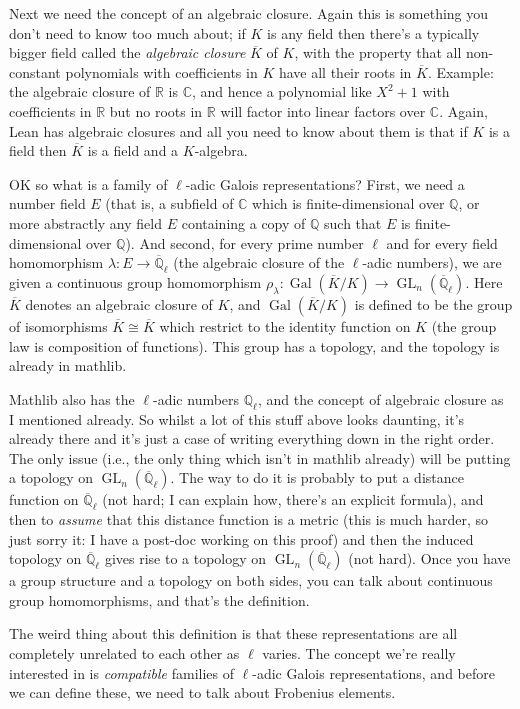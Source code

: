 \documentclass{amsart}
\newcommand{\Q}{\mathbb{Q}}
\newcommand{\R}{\mathbb{R}}
\newcommand{\C}{\mathbb{C}}
\DeclareMathOperator{\GL}{GL}
\DeclareMathOperator{\Gal}{Gal}
\begin{document}
Next we need the concept of an algebraic closure. Again this is something you don't need to know too much about; if $K$ is any field then there's a typically bigger field called the \emph{algebraic closure} $\overline{K}$ of $K$, with the property that all non-constant polynomials with coefficients in $K$ have all their roots in $\overline{K}$. Example: the algebraic closure of $\R$ is $\C$, and hence a polynomial like $X^2+1$ with coefficients in $\R$ but no roots in $\R$ will factor into linear factors over $\C$. Again, Lean has algebraic closures and all you need to know about them is that if $K$ is a field then $\overline{K}$ is a field and a $K$-algebra.

OK so what is a family of $\ell$-adic Galois representations? First, we need a number field $E$ (that is, a subfield of $\C$ which is finite-dimensional over $\Q$, or more abstractly any field $E$ containing a copy of $\Q$ such that $E$ is finite-dimensional over $\Q$). And second, for every prime number $\ell$ and for every field homomorphism $\lambda:E\to\overline{\Q}_\ell$ (the algebraic closure of the $\ell$-adic numbers), we are given a continuous group homomorphism $\rho_\lambda:\Gal(\overline{K}/K)\to\GL_n(\overline{\Q}_\ell)$. Here $\overline{K}$ denotes an algebraic closure of $K$, and $\Gal(\overline{K}/K)$ is defined to be the group of isomorphisms $\overline{K}\cong\overline{K}$ which restrict to the identity function on $K$ (the group law is composition of functions). This group has a topology, and the topology is already in mathlib.

Mathlib also has the $\ell$-adic numbers $\Q_\ell$, and the concept of algebraic closure as I mentioned already. So whilst a lot of this stuff above looks daunting, it's already there and it's just a case of writing everything down in the right order. The only issue (i.e., the only thing which isn't in mathlib already) will be putting a topology on $\GL_n(\overline{\Q}_\ell)$. The way to do it is probably to put a distance function on $\overline{\Q}_\ell$ (not hard; I can explain how, there's an explicit formula), and then to \emph{assume} that this distance function is a metric (this is much harder, so just sorry it: I have a post-doc working on this proof) and then the induced topology on $\overline{\Q}_\ell$ gives rise to a topology on $\GL_n(\overline{\Q}_\ell)$ (not hard). Once you have a group structure and a topology on both sides, you can talk about continuous group homomorphisms, and that's the definition.

The weird thing about this definition is that these representations are all completely unrelated to each other as $\ell$ varies. The concept we're really interested in is \emph{compatible} families of $\ell$-adic Galois representations, and before we can define these, we need to talk about Frobenius elements.
\end{document}
